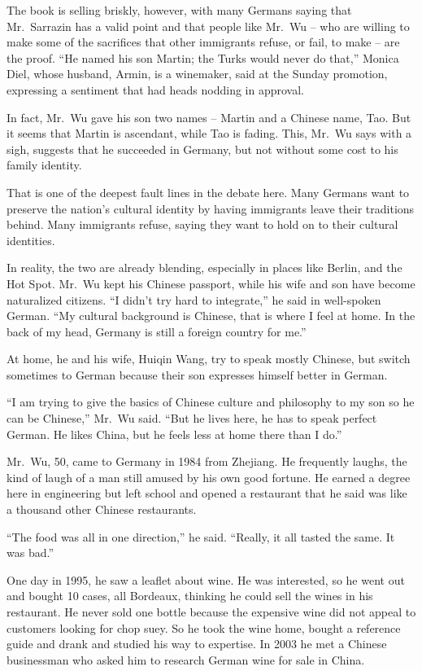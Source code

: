 ﻿\documentclass[12pt]{article}
\begin{document}
The book is selling briskly, however, with many Germans saying that Mr.~Sarrazin has a valid point
and that people like Mr.~Wu -- who are willing to make some of the sacrifices that other immigrants
refuse, or fail, to make -- are the proof. ``He named his son Martin; the Turks would never do
that,'' Monica Diel, whose husband, Armin, is a winemaker, said at the Sunday promotion, expressing
a sentiment that had heads nodding in approval.

In fact, Mr.~Wu gave his son two names -- Martin and a Chinese name, Tao. But it seems that Martin
is ascendant, while Tao is fading. This, Mr.~Wu says with a sigh, suggests that he succeeded in
Germany, but not without some cost to his family identity.

That is one of the deepest fault lines in the debate here. Many Germans want to preserve the
nation's cultural identity by having immigrants leave their traditions behind. Many immigrants
refuse, saying they want to hold on to their cultural identities.

In reality, the two are already blending, especially in places like Berlin, and the Hot Spot. Mr.~Wu
kept his Chinese passport, while his wife and son have become naturalized citizens. ``I didn't try
hard to integrate,'' he said in well-spoken German. ``My cultural background is Chinese, that is
where I feel at home. In the back of my head, Germany is still a foreign country for me.''

At home, he and his wife, Huiqin Wang, try to speak mostly Chinese, but switch sometimes to German
because their son expresses himself better in German.

``I am trying to give the basics of Chinese culture and philosophy to my son so he can be Chinese,''
Mr.~Wu said. ``But he lives here, he has to speak perfect German. He likes China, but he feels less
at home there than I do.''

Mr.~Wu, 50, came to Germany in 1984 from Zhejiang. He frequently laughs, the kind of laugh of a man
still amused by his own good fortune. He earned a degree here in engineering but left school and
opened a restaurant that he said was like a thousand other Chinese restaurants.

``The food was all in one direction,'' he said. ``Really, it all tasted the same. It was bad.''

One day in 1995, he saw a leaflet about wine. He was interested, so he went out and bought 10 cases,
all Bordeaux, thinking he could sell the wines in his restaurant. He never sold one bottle because
the expensive wine did not appeal to customers looking for chop suey. So he took the wine home,
bought a reference guide and drank and studied his way to expertise. In 2003 he met a Chinese
businessman who asked him to research German wine for sale in China.
\end{document}
